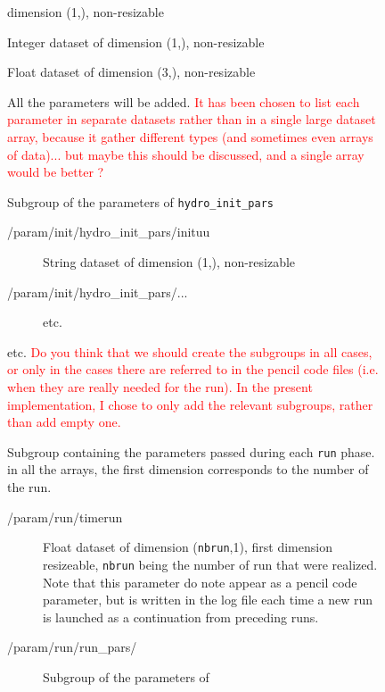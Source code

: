 \documentclass[a4paper,12pt]{article}
\newcommand{\note}[1]{\textcolor{red}{#1}}
\begin{document}
\begin{figure}[p]
{\begin{description}
\begin{description}
\begin{description}
\begin{description}
\begin{description}
            dimension (1,), non-resizable
          \item[/param/init/init\_pars/ip] Integer dataset of
            dimension (1,), non-resizable
          \item[/param/init/init\_pars/xyz0] Float dataset of
            dimension (3,), non-resizable
          \item[/param/init/init\_pars/...] All the parameters will be
            added. \note{It has been chosen to list each parameter in
            separate datasets rather than in a single large dataset
            array, because it gather different types (and sometimes
            even arrays of data)... but maybe this should be discussed,
            and a single array would be better ?}
        \end{description}
      \item[/param/init/hydro\_init\_pars/] Subgroup of the parameters
        of \texttt{hydro\_init\_pars}
        \begin{description}
        \item[/param/init/hydro\_init\_pars/inituu] String dataset of
            dimension (1,), non-resizable
        \item[/param/init/hydro\_init\_pars/...] etc.
        \end{description}
      \item[/param/init/...\_init\_pars/] etc. \note{Do you think that we
        should create the subgroups in all cases, or only in the cases
        there are referred to in the pencil code files (i.e. when they
        are really needed for the run). In the present implementation,
        I chose to only add the relevant subgroups, rather than add
        empty one.}
      \end{description}
    \item[/param/run/] Subgroup containing the parameters
      passed during each \texttt{run} phase. in all the arrays, the
      first dimension corresponds to the number of the run.
      \begin{description}
      \item[/param/run/timerun] Float dataset of
        dimension (\texttt{nbrun},1), first dimension resizeable, \texttt{nbrun} being
        the number of run that were realized. Note that this
        parameter do note appear as a pencil code parameter, but is
        written in the log file each time a new run is launched as a
        continuation from preceding runs.
      \item[/param/run/run\_pars/] Subgroup of the parameters of

\end{description}
\end{description}
\end{description}
\end{description}}
\end{figure}
\end{document}
